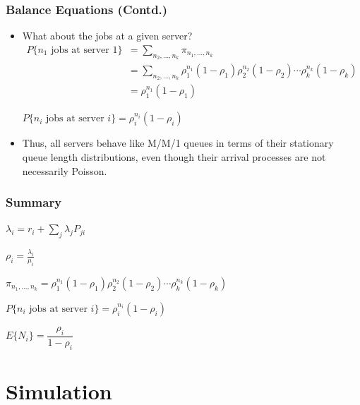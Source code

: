 \documentclass[10pt,notes]{beamer}
\begin{document}
\begin{frame}
    \frametitle{Balance Equations (Contd.)}
    \begin{itemize}
        \item What about the jobs at a given server?
            \begin{align*}
                P\{n_1 \text{ jobs at server } 1\} &= \sum_{n_2,\ldots,n_k} \pi_{n_1,\ldots,n_k} \\
                &= \sum_{n_2,\ldots,n_k} \rho_1^{n_1} (1 - \rho_1) \rho_2^{n_2} (1 - \rho_2) \cdots \rho_k^{n_k} (1 - \rho_k) \\
                &= \rho_1^{n_1} (1 - \rho_1)
            \end{align*}
        
        \begin{tcolorbox}
            \centering $P\{n_i \text{ jobs at server } i\} = \rho_i^{n_i} (1 - \rho_i)$
        \end{tcolorbox}
        \item Thus, all servers behave like M/M/1 queues in terms of their stationary queue length distributions, even though their arrival processes are not necessarily Poisson.
    \end{itemize}
\end{frame}

\begin{frame}
    \frametitle{Summary}
    \begin{tcolorbox}
        \centering $\lambda_i = r_i + \sum_j \lambda_j P_{ji}$
    \end{tcolorbox}
    \begin{tcolorbox}
        \centering $\rho_i = \frac{\lambda_i}{\mu_i}$
    \end{tcolorbox}
    \begin{tcolorbox}
        \centering $\pi_{n_1,\ldots,n_k} = \rho_1^{n_1} (1 - \rho_1) \rho_2^{n_2} (1 - \rho_2) \cdots \rho_k^{n_k} (1 - \rho_k)$
    \end{tcolorbox}
    \begin{tcolorbox}
        \centering $P\{n_i \text{ jobs at server } i\} = \rho_i^{n_i} (1 - \rho_i)$
    \end{tcolorbox}
    \begin{tcolorbox}
        \centering $E\{N_i\} = \dfrac{\rho_i}{1 - \rho_i}$
    \end{tcolorbox}
\end{frame}

\section{Simulation}
\end{document}
